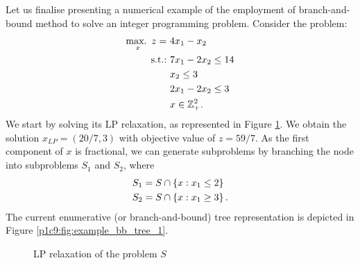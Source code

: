 Let us finalise presenting a numerical example of the employment of branch-and-bound method to solve an integer programming problem. Consider the problem:
%
\begin{align*}
    \mathop{\text{max.~}}_x z = ~& 4x_1 - x_2 \\
    \mathop{\text{s.t.:~}} & 7x_1 - 2x_2 \leq 14 \\
    &x_2 \leq 3 \\
    &2x_1 - 2x_2 \leq 3 \\
    &x \in \mathbb{Z}^2_+.
\end{align*} 
%
We start by solving its LP relaxation, as represented in Figure \ref{p1c9:fig:example_LP_relaxation_solution}. We obtain the solution $x_{LP}=(20/7, 3)$ with objective value of $z=59/7$. As the first component of $x$ is fractional, we can generate subproblems by branching the node into subproblems $S_1$ and $S_2$, where
%
\begin{align*}
	& S_1 = S \cap \left\{ x : x_1 \leq 2 \right \} \\
	& S_2 = S \cap \left\{ x : x_1 \geq 3 \right \}.
\end{align*}
%
The current enumerative (or branch-and-bound) tree representation is depicted in Figure \ref{p1c9:fig:example_bb_tree_1}.

\begin{figure}[H]
	\caption{LP relaxation of the problem $S$}\label{p1c9:fig:example_LP_relaxation_solution}	
\end{figure}


